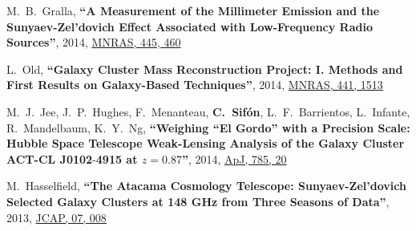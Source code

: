 \documentclass{article}
\def\myself{\textbf{\color{red} C.~Sif\'on}}
\def\apj{ApJ}
\def\jcap{JCAP}
\def\mnras{MNRAS}
\newcommand{\paper}[1]{\textbf{``#1''}}
\begin{document}
\begin{etaremune}
\item
M.~B.~Gralla, 
\paper{A Measurement of the Millimeter Emission and the Sunyaev-Zel'dovich Effect Associated with 
Low-Frequency Radio Sources},
2014, \href{http://adsabs.harvard.edu/adsabs/abs/2014MNRAS.445..460G}{\mnras, 445, 460}

\item
L.~Old, 
\paper{Galaxy Cluster Mass Reconstruction Project: I. Methods and First Results on Galaxy-Based 
Techniques},
2014, \href{http://adsabs.harvard.edu/adsabs/abs/2014MNRAS.441.1513O}{\mnras, 441, 1513}

\item
M.~J.~Jee, J.~P.~Hughes, F.~Menanteau, \myself, L.~F.~Barrientos, L.~Infante, R.~Mandelbaum, 
K.~Y.~Ng,
\paper{Weighing ``El Gordo'' with a Precision Scale: Hubble Space Telescope Weak-Lensing Analysis
of the Galaxy Cluster ACT-CL J0102$\textbf{-}$4915 at $z=0.87$},
2014, \href{http://adsabs.harvard.edu/adsabs/abs/2014ApJ...785...20J}{\apj, 785, 20}

\item
M.~Hasselfield, 
\paper{The Atacama Cosmology Telescope: Sunyaev-Zel'dovich Selected Galaxy Clusters at 148 GHz from 
Three Seasons of Data},
2013, \href{http://adsabs.harvard.edu/adsabs/abs/2013arXiv1301.0816H}{\jcap, 07, 008}


\end{etaremune}
\end{document}
